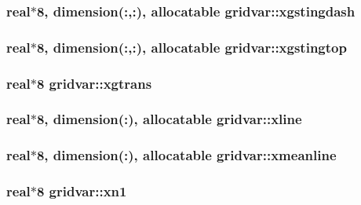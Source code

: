 \subsubsection[{xgstingdash}]{\setlength{\rightskip}{0pt plus 5cm}real$\ast$8, dimension(\+:,\+:), allocatable gridvar\+::xgstingdash}\label{namespacegridvar_a995496c4b06b80179c34232029a8c471}
\hypertarget{namespacegridvar_a13592c5c62fa4125e18fa8df3f64a43b}{}
\subsubsection[{xgstingtop}]{\setlength{\rightskip}{0pt plus 5cm}real$\ast$8, dimension(\+:,\+:), allocatable gridvar\+::xgstingtop}\label{namespacegridvar_a13592c5c62fa4125e18fa8df3f64a43b}
\hypertarget{namespacegridvar_a0a1d150b576fa8e1243bb1aa8ab04fa0}{}
\subsubsection[{xgtrans}]{\setlength{\rightskip}{0pt plus 5cm}real$\ast$8 gridvar\+::xgtrans}\label{namespacegridvar_a0a1d150b576fa8e1243bb1aa8ab04fa0}
\hypertarget{namespacegridvar_ad36217840661114bf87efd88b8e0ef9f}{}
\subsubsection[{xline}]{\setlength{\rightskip}{0pt plus 5cm}real$\ast$8, dimension(\+:), allocatable gridvar\+::xline}\label{namespacegridvar_ad36217840661114bf87efd88b8e0ef9f}
\hypertarget{namespacegridvar_ad19621a7f5affe93e33f8a58730527ca}{}
\subsubsection[{xmeanline}]{\setlength{\rightskip}{0pt plus 5cm}real$\ast$8, dimension(\+:), allocatable gridvar\+::xmeanline}\label{namespacegridvar_ad19621a7f5affe93e33f8a58730527ca}
\hypertarget{namespacegridvar_a314572d3cf48c6611fe18f0c35f14aa2}{}
\subsubsection[{xn1}]{\setlength{\rightskip}{0pt plus 5cm}real$\ast$8 gridvar\+::xn1}\label{namespacegridvar_a314572d3cf48c6611fe18f0c35f14aa2}
\hypertarget{namespacegridvar_a62f11262a634086d3483618aff305ad6}{}
